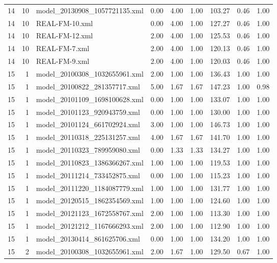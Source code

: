 \begin{table}[ht]
\begin{tabular}{rrlrrrrrr}
   14 &  10 & model\_20130908\_1057721135.xml & 0.00 & 4.00 & 1.00 & 103.27 & 0.46 & 1.00 \\ 
   14 &  10 & REAL-FM-10.xml & 0.00 & 4.00 & 1.00 & 127.27 & 0.46 & 1.00 \\ 
   14 &  10 & REAL-FM-12.xml & 2.00 & 4.00 & 1.00 & 125.53 & 0.46 & 1.00 \\ 
   14 &  10 & REAL-FM-7.xml & 2.00 & 4.00 & 1.00 & 120.13 & 0.46 & 1.00 \\ 
   14 &  10 & REAL-FM-9.xml & 2.00 & 4.00 & 1.00 & 120.03 & 0.46 & 1.00 \\ 
   15 &   1 & model\_20100308\_1032655961.xml & 2.00 & 1.00 & 1.00 & 136.43 & 1.00 & 1.00 \\ 
   15 &   1 & model\_20100822\_281357717.xml & 5.00 & 1.67 & 1.67 & 147.23 & 1.00 & 0.98 \\ 
   15 &   1 & model\_20101109\_1698100628.xml & 0.00 & 1.00 & 1.00 & 133.07 & 1.00 & 1.00 \\ 
   15 &   1 & model\_20101123\_920943759.xml & 0.00 & 1.00 & 1.00 & 130.00 & 1.00 & 1.00 \\ 
   15 &   1 & model\_20101124\_661702924.xml & 3.00 & 1.00 & 1.00 & 146.73 & 1.00 & 1.00 \\ 
   15 &   1 & model\_20110318\_225131257.xml & 4.00 & 1.67 & 1.67 & 141.70 & 1.00 & 1.00 \\ 
   15 &   1 & model\_20110323\_789959080.xml & 0.00 & 1.33 & 1.33 & 134.27 & 1.00 & 1.00 \\ 
   15 &   1 & model\_20110823\_1386366267.xml & 1.00 & 1.00 & 1.00 & 119.53 & 1.00 & 1.00 \\ 
   15 &   1 & model\_20111214\_733452875.xml & 0.00 & 1.00 & 1.00 & 115.23 & 1.00 & 1.00 \\ 
   15 &   1 & model\_20111220\_1184087779.xml & 1.00 & 1.00 & 1.00 & 131.77 & 1.00 & 1.00 \\ 
   15 &   1 & model\_20120515\_1862354569.xml & 1.00 & 1.00 & 1.00 & 124.60 & 1.00 & 1.00 \\ 
   15 &   1 & model\_20121123\_1672558767.xml & 2.00 & 1.00 & 1.00 & 113.30 & 1.00 & 1.00 \\ 
   15 &   1 & model\_20121212\_1167666293.xml & 2.00 & 1.00 & 1.00 & 112.90 & 1.00 & 1.00 \\ 
   15 &   1 & model\_20130414\_861625706.xml & 0.00 & 1.00 & 1.00 & 134.20 & 1.00 & 1.00 \\ 
   15 &   2 & model\_20100308\_1032655961.xml & 2.00 & 1.67 & 1.00 & 129.50 & 0.67 & 1.00 \\ 

\end{tabular}
\end{table}
